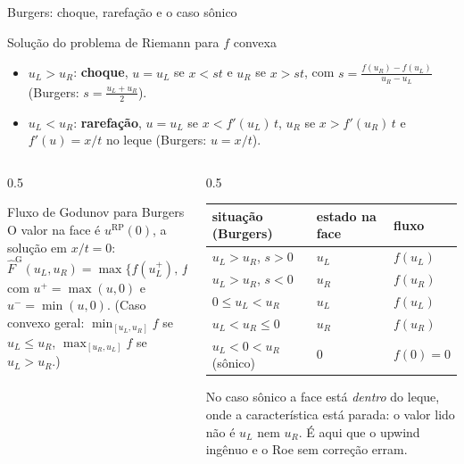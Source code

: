 \documentclass[aspectratio=169,10pt]{beamer}
\newcommand{\Fh}{\widehat F}
\newcommand{\RP}{u^{\mathrm{RP}}}
\begin{document}
\begin{frame}{Burgers: choque, rarefação e o caso sônico}
\begin{teorema}{Solução do problema de Riemann para $f$ convexa}
\begin{itemize}
\item $u_L>u_R$: \textbf{choque}, $u=u_L$ se $x<st$ e $u_R$ se $x>st$, com $s=\frac{f(u_R)-f(u_L)}{u_R-u_L}$ (Burgers: $s=\frac{u_L+u_R}{2}$).
\item $u_L<u_R$: \textbf{rarefação}, $u=u_L$ se $x<f'(u_L)\,t$, $u_R$ se $x>f'(u_R)\,t$ e $f'(u)=x/t$ no leque (Burgers: $u=x/t$).
\end{itemize}
\end{teorema}
\begin{columns}[T]
\begin{column}{0.5\textwidth}
\begin{definicao}{Fluxo de Godunov para Burgers}
O valor na face é $\RP(0)$, a solução em $x/t=0$:
\[
\Fh^{\mathrm G}(u_L,u_R)=\max\big\{f(u_L^+),\,f(u_R^-)\big\},
\]
com $u^+=\max(u,0)$ e $u^-=\min(u,0)$. (Caso convexo geral: $\min_{[u_L,u_R]}f$ se $u_L\le u_R$, $\max_{[u_R,u_L]}f$ se $u_L>u_R$.)
\end{definicao}
\end{column}
\begin{column}{0.5\textwidth}
\begin{center}\scriptsize
\begin{tabular}{@{}lll@{}}
\toprule
situação (Burgers) & estado na face & fluxo\\
\midrule
$u_L>u_R$, $s>0$ & $u_L$ & $f(u_L)$\\
$u_L>u_R$, $s<0$ & $u_R$ & $f(u_R)$\\
$0\le u_L<u_R$ & $u_L$ & $f(u_L)$\\
$u_L<u_R\le0$ & $u_R$ & $f(u_R)$\\
$u_L<0<u_R$ (sônico) & $0$ & $f(0)=0$\\
\bottomrule
\end{tabular}
\end{center}
\begin{intuicao}
No caso sônico a face está \emph{dentro} do leque, onde a característica está parada: o valor lido não é $u_L$ nem $u_R$. É aqui que o upwind ingênuo e o Roe sem correção erram.
\end{intuicao}
\end{column}
\end{columns}
\end{frame}
\end{document}
